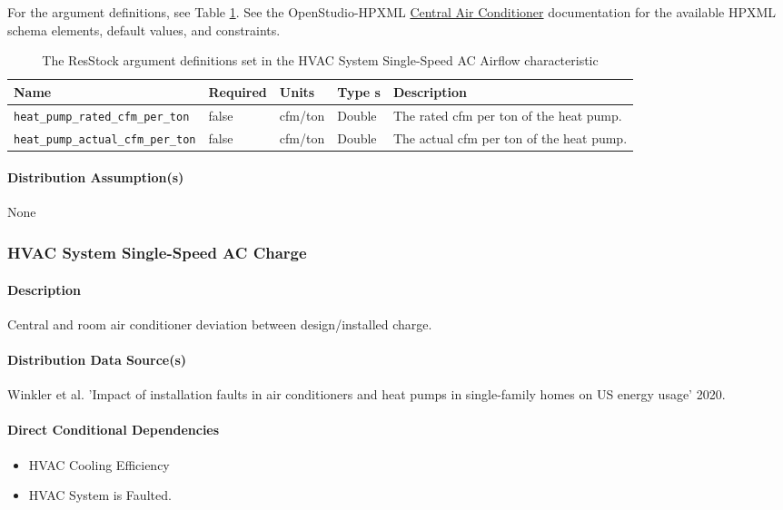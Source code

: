 For the argument definitions, see Table \ref{table:hc_arg_def_hvac_ss_ac_airflow}. See the OpenStudio-HPXML \href{-https://openstudio-hpxml.readthedocs.io/en/v1.8.1/workflow_inputs.html#central-air-conditioner}{Central Air Conditioner} documentation for the available HPXML schema elements, default values, and constraints.

\begin{longtable}[]{|p{3.5cm}|p{1.5cm}|p{1.3cm}|p{1.1cm}|p{3.5cm}|} \caption{The ResStock argument definitions set in the HVAC System Single-Speed AC Airflow characteristic} \label{table:hc_arg_def_hvac_ss_ac_airflow}\\
\toprule\noalign{}
Name & Required & Units & Type s & Description \\
\midrule\noalign{}
\endhead
\bottomrule\noalign{}
\endlastfoot
\texttt{heat\_pump\_rated\_cfm\_per\_ton} & false & cfm/ton & Double & 
The rated cfm per ton of the heat pump. \\
\hline
\texttt{heat\_pump\_actual\_cfm\_per\_ton} & false & cfm/ton & Double 
& The actual cfm per ton of the heat pump. \\
\end{longtable}
\paragraph{Distribution Assumption(s)}
None

\subsubsection{HVAC System Single-Speed AC Charge}

\paragraph{Description}
Central and room air conditioner deviation between design/installed charge.

\paragraph{Distribution Data Source(s)}
Winkler et al. 'Impact of installation faults in air conditioners and heat pumps in single-family homes on US energy usage' 2020.
\paragraph{Direct Conditional Dependencies}
\begin{itemize}
    \item HVAC Cooling Efficiency
    \item HVAC System is Faulted.
\end{itemize}

